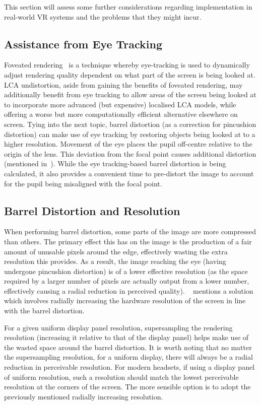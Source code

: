 This section will assess some further considerations regarding implementation in real-world VR systems and the problems that they might incur.

\subsection{Assistance from Eye Tracking}\label{sec:eye-tracking}

Foveated rendering~\cite{patney2016towards} is a technique whereby eye-tracking is used to dynamically adjust rendering quality dependent on what part of the screen is being looked at.
LCA undistortion, aside from gaining the benefits of foveated rendering, may additionally benefit from eye tracking to allow areas of the screen being looked at to incorporate more advanced (but expensive) localised LCA models, while offering a worse but more computationally efficient alternative elsewhere on screen.
Tying into the next topic, barrel distortion (as a correction for pincushion distortion) can make use of eye tracking by restoring objects being looked at to a higher resolution.
Movement of the eye places the pupil off-centre relative to the origin of the lens.
This deviation from the focal point causes additional distortion (mentioned in~\cite[ch.~5]{lavalle2020virtual}).
While the eye tracking-based barrel distortion is being calculated, it also provides a convenient time to pre-distort the image to account for the pupil being misaligned with the focal point.

\subsection{Barrel Distortion and Resolution}\label{sec:barrel-distortion-resolution}

When performing barrel distortion, some parts of the image are more compressed than others.
The primary effect this has on the image is the production of a fair amount of unusable pixels around the edge, effectively wasting the extra resolution this provides.
As a result, the image reaching the eye (having undergone pincushion distortion) is of a lower effective resolution (as the space required by a larger number of pixels are actually output from a lower number, effectively causing a radial reduction in perceived quality).
~\cite{lavalle2020virtual} mentions a solution which involves radially increasing the hardware resolution of the screen in line with the barrel distortion.

For a given uniform display panel resolution, supersampling the rendering resolution (increasing it relative to that of the display panel) helps make use of the wasted space around the barrel distortion.
It is worth noting that no matter the supersampling resolution, for a uniform display, there will always be a radial reduction in perceivable resolution.
For modern headsets, if using a display panel of uniform resolution, such a resolution should match the lowest perceivable resolution at the corners of the screen.
The more sensible option is to adopt the previously mentioned radially increasing resolution.
